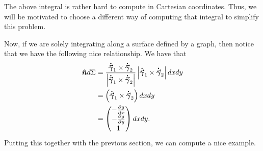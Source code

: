                                      \begin{remark}
                                     	The above integral is rather hard to compute in Cartesian coordinates.  Thus, we will be motivated to choose a different way of computing that integral to simplify this problem.
                                     \end{remark}
                                     
                                     Now, if we are solely integrating along a surface defined by a graph, then notice that we have the following nice relationship.  We have that 
                                     \begin{align*}
                                     \boldsymbol{\hat{n}} d\Sigma &= \frac{\boldsymbol{\dot{\vec{\gamma}}}_1\times \boldsymbol{\dot{\vec{\gamma}}}_2}{\left|\boldsymbol{\dot{\vec{\gamma}}}_1 \times \boldsymbol{\dot{\vec{\gamma}}}_2\right|} \left|\boldsymbol{\dot{\vec{\gamma}}}_1 \times \boldsymbol{\dot{\vec{\gamma}}}_2 \right| dxdy\\
                                     &= \left(\boldsymbol{\dot{\vec{\gamma}}}_1 \times \boldsymbol{\dot{\vec{\gamma}}}_2\right)dxdy\\
                                     &= \begin{pmatrix} -\frac{\partial g}{\partial x} \\ -\frac{\partial g}{\partial y} \\ 1 \end{pmatrix} dx dy.
                                     \end{align*}
                                      Putting this together with the previous section, we can compute a nice example.  
                                     
